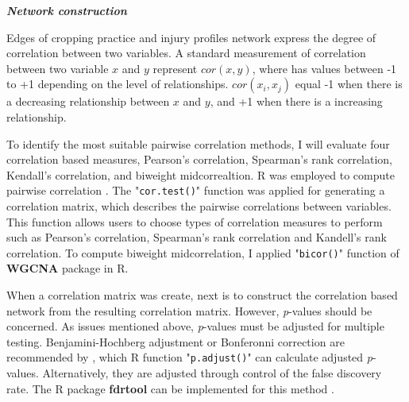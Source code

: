 
\textit{\textbf{Network construction}}



Edges of cropping practice and injury profiles network express the degree of correlation between two variables. A standard measurement of correlation between two variable $x$ and $y$ represent $cor(x,y)$, where has values between -1 to +1 depending on the level of relationships. $cor(x_{i}, x_{j})$ equal -1 when there is a decreasing relationship between $x$ and $y$, and +1 when there is a increasing relationship.

To identify the most suitable pairwise correlation methods, I will evaluate four correlation based measures, Pearson's correlation, Spearman's rank correlation, Kendall's correlation, and biweight midcorrealtion. R was employed to compute pairwise correlation . The "\texttt{cor.test()}" function was applied for generating a correlation matrix, which describes the pairwise correlations between variables. This function allows users to choose types of correlation measures to perform such as Pearson's correlation, Spearman's rank correlation and Kandell's rank correlation. To compute biweight midcorrelation, I applied "\texttt{bicor()}" function of \textbf{WGCNA} package  in R. 

When a correlation matrix was create, next is to construct the correlation based network from the resulting correlation matrix. However, \textit{p}-values should be concerned. As issues mentioned above, \textit{p}-values must be adjusted for multiple testing. Benjamini-Hochberg adjustment or Bonferonni correction are recommended by , which R function "\texttt{p.adjust()}" can calculate adjusted \textit{p}-values. Alternatively, they are adjusted through control of the false discovery rate. The R package \textbf{fdrtool} can be implemented for this method .


